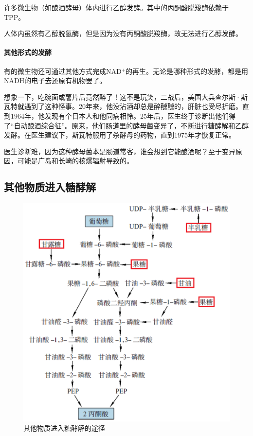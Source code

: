 许多微生物（如酿酒酵母）体内进行乙醇发酵。其中的丙酮酸脱羧酶依赖于TPP。

人体内虽然有乙醇脱氢酶，但是因为没有丙酮酸脱羧酶，故无法进行乙醇发酵。

\paragraph{其他形式的发酵}

有的微生物还可通过其他方式完成NAD$^{+}$的再生。无论是哪种形式的发酵，都是用NADH的电子去还原有机物罢了。

\begin{gs}[：不喝酒也醉酒的秘密]

	\hspace{2em}想象一下，吃碗面或薯片后竟然醉了！这不是玩笑，二战后，美国大兵查尔斯·斯瓦特就遇到了这种怪事。20年来，他没沾酒却总是醉醺醺的，肝脏也受尽折磨。直到1964年，他发现有个日本人和他同病相怜。25年后，医生终于诊断出他们得了“自动酿酒综合征”。原来，他们肠道里的酵母菌变异了，不断进行糖酵解和乙醇发酵。在医生建议下，斯瓦特服用了杀酵母的药物，直到1975年才恢复正常。

	\hspace{2em}医生诊断难，因为这种酵母菌本是肠道常客，谁会想到它能酿酒呢？至于变异原因，可能是广岛和长崎的核爆辐射导致的。
\end{gs}

\subsection{其他物质进入糖酵解}

\begin{figure}[htbp]
	\centering
	\includegraphics[width=0.8\linewidth]{Pics/其他物质进入糖酵解}
	\caption{其他物质进入糖酵解的途径}
	\label{fig:其他物质进入糖酵解的途径}
\end{figure}

